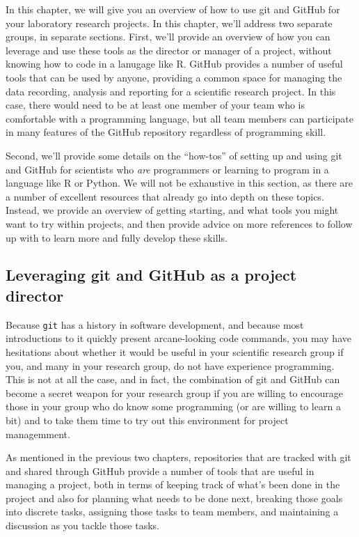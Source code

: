 \documentclass[]{tufte-book}
\begin{document}
In this chapter, we will give you an overview of how to use git and GitHub
for your laboratory research projects. In this chapter, we'll address two
separate groups, in separate sections. First, we'll provide an overview of how
you can leverage and use these tools as the director or manager of a project,
without knowing how to code in a lanugage like R. GitHub provides a number of
useful tools that can be used by anyone, providing a common space for managing
the data recording, analysis and reporting for a scientific research project.
In this case, there would need to be at least one member of your team who is
comfortable with a programming language, but all team members can participate
in many features of the GitHub repository regardless of programming skill.

Second, we'll provide some details on the ``how-tos'' of setting up and using
git and GitHub for scientists who \emph{are} programmers or learning to program in
a language like R or Python. We will not be exhaustive in this section, as there
are a number of excellent resources that already go into depth on these topics.
Instead, we provide an overview of getting starting, and what tools you might
want to try within projects, and then provide advice on more references to follow
up with to learn more and fully develop these skills.

\hypertarget{leveraging-git-and-github-as-a-project-director}{%
\subsection{Leveraging git and GitHub as a project director}\label{leveraging-git-and-github-as-a-project-director}}

Because \texttt{git} has a history in software development, and because most
introductions to it quickly present arcane-looking code commands, you may have
hesitations about whether it would be useful in your scientific research group
if you, and many in your research group, do not have experience programming.
This is not at all the case, and in fact, the combination of git and GitHub can
become a secret weapon for your research group if you are willing to encourage
those in your group who do know some programming (or are willing to learn a bit)
and to take them time to try out this environment for project managemment.

As mentioned in the previous two chapters, repositories that are tracked with
git and shared through GitHub provide a number of tools that are useful in
managing a project, both in terms of keeping track of what's been done in the
project and also for planning what needs to be done next, breaking those goals
into discrete tasks, assigning those tasks to team members, and maintaining a
discussion as you tackle those tasks.
\end{document}
